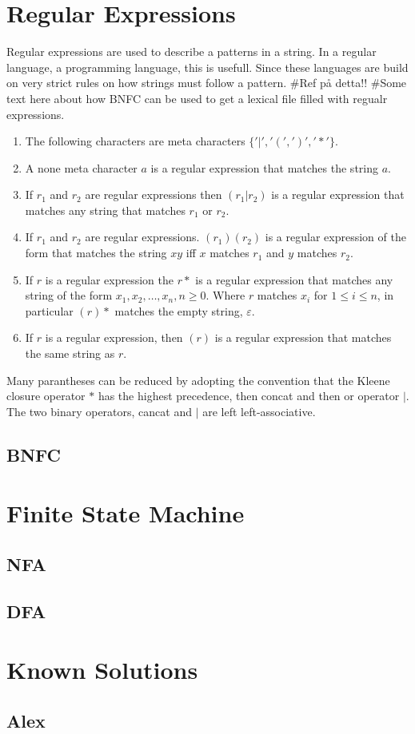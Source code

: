 \section{Regular Expressions}
Regular expressions are used to describe a patterns in a string.
In a regular language, a programming language, this is usefull.
Since these languages are build on very strict rules on how strings
must follow a pattern. \#Ref på detta!! 
\#Some text here about how BNFC can be used to get a lexical file filled with
regualr expressions. 
\begin{definition}
\begin{enumerate}
  \item The following characters are meta characters $\{ '|', '(', ')', '*' \}$.
  \item A none meta character $a$ is a regular expression that matches the 
      string $a$.
  \item If $r_1$ and $r_2$ are regular expressions then $(r_1 | r_2)$ is a 
      regular expression that matches any string that matches $r_1$ or $r_2$.
  \item If $r_1$ and $r_2$ are regular expressions. $(r_1)(r_2)$ is a regular
      expression of the form that matches the string $xy$ iff $x$ matches $r_1$
      and $y$ matches $r_2$.
  \item If $r$ is a regular expression the $r*$ is a regular expression that
      matches any string of the form $x_1, x_2, \dots , x_n, n \geq 0$.
      Where $r$ matches $x_i$ for $1 \leq i \leq n$, in particular $(r)*$ 
      matches the empty string, $\varepsilon$.
  \item If $r$ is a regular expression, then $(r)$ is a regular expression that
      matches the same string as $r$.
\end{enumerate}
\end{definition}
Many parantheses can be reduced by adopting the convention that the Kleene
closure operator $*$ has the highest precedence, then concat and then or
operator $|$. The two binary operators, cancat and $|$ are left 
left-associative. \cite{Aho}
\subsection{BNFC}
\section{Finite State Machine}
\subsection{NFA}
\subsection{DFA}
\section{Known Solutions}
\subsection{Alex}

 
